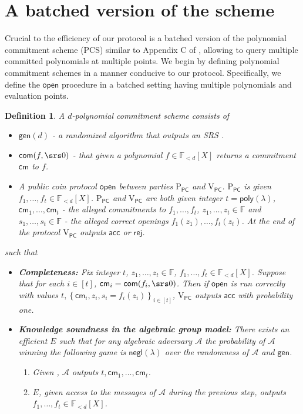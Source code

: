 \documentclass[11pt]{article} %
\newcommand{\F}{\ensuremath{\mathbb F}\xspace}
\newcommand{\adv}{\ensuremath{\mathcal A}\xspace}
\newcommand{\com}{\ensuremath{\mathsf{com}}\xspace}
\newcommand{\cm}{\ensuremath{\mathsf{cm}}\xspace}
\newcommand{\open}{\ensuremath{\mathsf{open}}\xspace}
\newcommand{\negl}{\ensuremath{\mathsf{negl}(\lambda)}\xspace}
\newcommand{\rej}{\ensuremath{\mathsf{rej}}\xspace}
\newcommand{\acc}{\ensuremath{\mathsf{acc}}\xspace}
\newcommand{\sett}[2]{\ensuremath{\set{#1}_{#2}}\xspace}
\newcommand{\gen}{\ensuremath{\mathsf{gen}}\xspace}
\newcommand{\prvpc}{\ensuremath{\mathrm{P_{\mathsf{PC}}}}\xspace}
\newcommand{\verpc}{\ensuremath{\mathrm{V_{\mathsf{PC}}}}\xspace}
\newcommand{\ext}{\ensuremath{E}\xspace}
\newcommand{\set}[1]{\ensuremath{\left\{#1\right\}}\xspace}
\newcommand{\polysofdeg}[1]{\ensuremath{\F_{< #1}[X]}\xspace}
\newtheorem{dfn}[lemma]{Definition}
\newcommand{\poly}{\ensuremath{\mathsf{poly(\lambda)}}\xspace}
\begin{document}
\section{A batched version of the \cite{kate} scheme}\label{sec:kate}
Crucial to the efficiency of our protocol is a batched version of the \cite{kate} polynomial commitment scheme (PCS) similar to Appendix C of \cite{sonic}, allowing to query multiple committed polynomials at multiple points.
We begin by defining polynomial commitment schemes in a manner conducive to our protocol.
Specifically, we define the \open procedure in a batched setting having multiple polynomials and evaluation points.

\begin{dfn}\label{dfn:PCscheme}
A $d$-polynomial commitment scheme consists of 
\begin{itemize}
 \item $\gen(d)$ -  a randomized algorithm that outputs an SRS .
 \item $\com(f,\srs0)$ - that given a polynomial $f\in \polysofdeg{d}$ returns a commitment \cm to $f$.
 \item A public coin protocol  \open between parties \prvpc and \verpc. \prvpc is given $ f_1,\ldots,f_t \in \polysofdeg{d}$. \prvpc and \verpc are both given integer $t=\poly$, $\cm_1,\ldots,\cm_t$ - the alleged commitments to $f_1,\ldots,f_t$, $z_1,\ldots,z_t\in\F$ and $s_1,\ldots,s_t\in \F$ - the alleged correct openings $f_1(z_1),\ldots,f_t(z_t)$. At the end of the protocol \verpc outputs \acc or \rej. 
\end{itemize}
such that
\begin{itemize}
 \item \textbf{Completeness:} Fix integer $t$, $z_1,\ldots,z_t\in \F$, $f_1,\ldots,f_t \in \polysofdeg{d}$.
 Suppose that for each $i\in [t]$, $\cm_i = \com(f_i,\srs0)$.  Then if \open is run correctly with values
 $t, \sett{\cm_i,z_i,s_i=f_i(z_i)}{i\in [t]}$, \verpc outputs \acc with probability one.
 \item \textbf{Knowledge soundness in the algebraic group model:} There exists an efficient \ext such that for any algebraic adversary \adv the probability of \adv winning the following game is \negl over the randomness of \adv and \gen.
 \begin{enumerate}
  \item Given , \adv outputs $t,\cm_1,\ldots,\cm_t$.
  \item \ext, given access to the messages of \adv during the previous step, outputs $f_1,\ldots,f_t \in \polysofdeg{d}$.

\end{enumerate}
\end{itemize}
\end{dfn}
\end{document}
